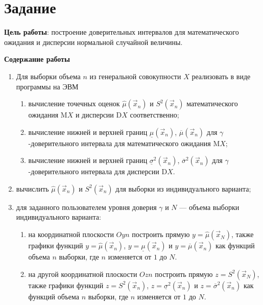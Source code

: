 \chapter{Задание}

\textbf{Цель работы}: построение доверительных интервалов для математического
ожидания и дисперсии нормальной случайной величины.

\textbf{Содержание работы}

\begin{enumerate}
    \item Для выборки объема $n$ из генеральной совокупности $X$ реализовать в
        виде программы на ЭВМ
        \begin{enumerate}[label=\asbuk*)]
            \item вычисление точечных оценок $\hat \mu(\vec x_n)$ и $S^2(\vec
                x_n)$ математического ожидания $\mathrm{M}X$ и дисперсии
                $\mathrm{D}X$ соответственно;
            \item вычисление нижней и верхней границ $\underline \mu (\vec
                x_n)$, $\overline \mu (\vec x_n)$ для
                \mbox{$\gamma$-доверительного} интервала для математического
                ожидания $\mathrm{M}X$;
            \item вычисление нижней и верхней границ $\underline \sigma^2 (\vec
                x_n)$, $\overline \sigma^2 (\vec x_n)$ для
                \mbox{$\gamma$-доверительного} интервала для дисперсии
                $\mathrm{D}X$.
        \end{enumerate}
    \item вычислить $\hat \mu(\vec x_n)$ и $S^2(\vec x_n)$ для выборки из
        индивидуального варианта;
    \item для заданного пользователем уровня доверия $\gamma$ и $N$ --- объема
        выборки индивидуального варианта:
        \begin{enumerate}[label=\asbuk*)]
            \item на координатной плоскости $Oyn$ построить прямую $y=\hat \mu
                (\vec x_N)$, также графики функций $y=\hat \mu (\vec x_n)$,
               $y=\underline \mu (\vec x_n)$ и $y=\overline \mu (\vec x_n)$
               как функций объема $n$ выборки, где $n$ изменяется от $1$
               до $N$.
            \item на другой координатной плоскости $Ozn$ построить прямую
                \mbox{$z=S^2 (\vec x_N)$}, также графики функций $z=S^2 (\vec
                x_n)$, $z=\underline \sigma^2 (\vec x_n)$ и \mbox{$z=\overline
                \sigma^2 (\vec x_n)$} как функций объема $n$ выборки, где $n$
                изменяется от $1$ до $N$.
        \end{enumerate}

\end{enumerate}

